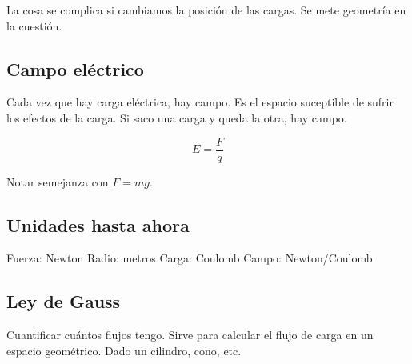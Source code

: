 La cosa se complica si cambiamos la posición de las cargas.
Se mete geometría en la cuestión.

\subsection{Campo eléctrico}

Cada vez que hay carga eléctrica, hay campo.
Es el espacio suceptible de sufrir los efectos de la carga.
Si saco una carga y queda la otra,
hay campo.

\begin{equation}
    E = \frac{F}{q}
\end{equation}

Notar semejanza con \(F=mg\).

\subsection{Unidades hasta ahora}

Fuerza: Newton
Radio: metros
Carga: Coulomb
Campo: Newton/Coulomb

\subsection{Ley de Gauss}

Cuantificar cuántos flujos tengo.
Sirve para calcular el flujo de carga en un espacio geométrico.
Dado un cilindro, cono, etc.
